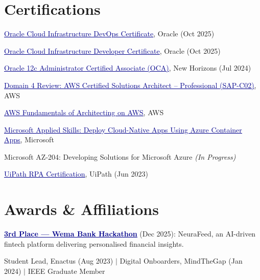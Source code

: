 \documentclass[letterpaper,10pt]{article}
\newcommand{\resumeSubHeadingListStart}{\begin{itemize}[leftmargin=0.15in, label={}]}
\newcommand{\resumeSubHeadingListEnd}{\end{itemize}}
\newcommand{\link}[2]{\href{#1}{\textcolor{darkblue}{\underline{#2}}}}
\begin{document}
\section{Certifications}
\resumeSubHeadingListStart
  \small{\item{
    \link{https://catalog-education.oracle.com/ords/certview/sharebadge?id=2AE32043664103BD1F363F0CFB45953132E6DD1E0DC56DACCEF889C6FC349FE0}{Oracle Cloud Infrastructure DevOps Certificate}, Oracle (Oct 2025)
  }}
  \small{\item{
    \link{https://catalog-education.oracle.com/ords/certview/sharebadge?id=6249543B0DB4347806CEC83C635E2E1A7E83F74B9DE58F219CE7E340B93BA84F}{Oracle Cloud Infrastructure Developer Certificate}, Oracle (Oct 2025)
  }}
  \small{\item{
    \link{https://catalog-education.oracle.com/ords/certview/sharebadge?id=6249543B0DB4347806CEC83C635E2E1A7E83F74B9DE58F219CE7E340B93BA84F}{Oracle 12c Administrator Certified Associate (OCA)}, New Horizons (Jul 2024)
  }}
  \small{\item{
    \link{https://drive.google.com/file/d/1484ZjBkBQ6WRXPBl1-RPtCFhDdVezPji/view?usp=sharing}{Domain 4 Review: AWS Certified Solutions Architect -- Professional (SAP-C02)}, AWS
  }}
  \small{\item{
    \link{https://drive.google.com/file/d/1NF0f-s8IngP8IxJV0LZKQXPhyD_oelDd/view?usp=sharing}{AWS Fundamentals of Architecting on AWS}, AWS
  }}
  \small{\item{
    \link{https://learn.microsoft.com/api/credentials/share/en-us/87864556/F8113CDCD50CB9F8?sharingId=5E6999516CAFD9FF}{Microsoft Applied Skills: Deploy Cloud-Native Apps Using Azure Container Apps}, Microsoft
  }}
  \small{\item{
    Microsoft AZ-204: Developing Solutions for Microsoft Azure \textit{(In Progress)}
  }}
  \small{\item{
    \link{https://cloud.uipath.com/intrepidtechnologiesltd/academy_/achievements}{UiPath RPA Certification}, UiPath (Jun 2023)
  }}
\resumeSubHeadingListEnd

\section{Awards \& Affiliations}
\resumeSubHeadingListStart
  \small{\item{
    \textbf{\link{https://hackaholics.wemabank.com/}{3rd Place --- Wema Bank Hackathon}} (Dec 2025): NeuraFeed, an AI-driven fintech platform delivering personalised financial insights.
  }}
  \small{\item{
    Student Lead, Enactus (Aug 2023) $|$ Digital Onboarders, MindTheGap (Jan 2024) $|$ IEEE Graduate Member
  }}
\resumeSubHeadingListEnd
\end{document}
